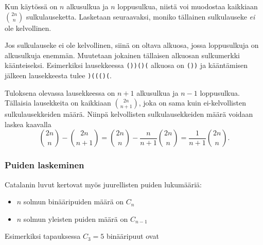 Kun käytössä on $n$ alkusulkua ja $n$ loppusulkua,
niistä voi muodostaa kaikkiaan ${2n \choose n}$
sulkulauseketta.
Lasketaan seuraavaksi, moniko tällainen
sulkulauseke \textit{ei} ole kelvollinen.

Jos sulkulauseke ei ole kelvollinen,
siinä on oltava alkuosa,
jossa loppusulkuja on alkusulkuja enemmän.
Muutetaan jokainen tällaisen alkuosan
sulkumerkki käänteiseksi.
Esimerkiksi lausekkeessa \texttt{())()(}
alkuosa on \texttt{())} ja kääntämisen
jälkeen lausekkeesta tulee \texttt{)((()(}.

Tuloksena olevassa lausekkeessa on $n+1$ alkusulkua
ja $n-1$ loppusulkua. Tällaisia lausekkeita on
kaikkiaan ${2n \choose n+1}$,
joka on sama kuin ei-kelvollisten
sulkulausekkeiden määrä.
Niinpä kelvollisten
sulkulausekkeiden määrä voidaan laskea kaavalla
\[{2n \choose n}-{2n \choose n+1} = {2n \choose n} - \frac{n}{n+1} {2n \choose n} = \frac{1}{n+1} {2n \choose n}.\]

\subsubsection{Puiden laskeminen}

Catalanin luvut kertovat myös juurellisten
puiden lukumääriä:

\begin{itemize}
\item $n$ solmun binääripuiden määrä on $C_n$
\item $n$ solmun yleisten puiden määrä on $C_{n-1}$
\end{itemize}
\noindent
Esimerkiksi tapauksessa $C_3=5$ binääripuut ovat

\begin{center}
\end{center}


